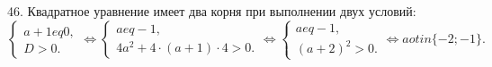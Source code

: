 46. Квадратное уравнение имеет два корня при выполнении двух условий:\\ $\begin{cases}a+1
eq0,\\ D>0.\end{cases}\Leftrightarrow
\begin{cases}a
eq-1,\\ 4a^2+4\cdot(a+1)\cdot4>0.\end{cases}\Leftrightarrow
\begin{cases}a
eq-1,\\ (a+2)^2>0.\end{cases}\Leftrightarrow a
otin\{-2;-1\}.$\\
